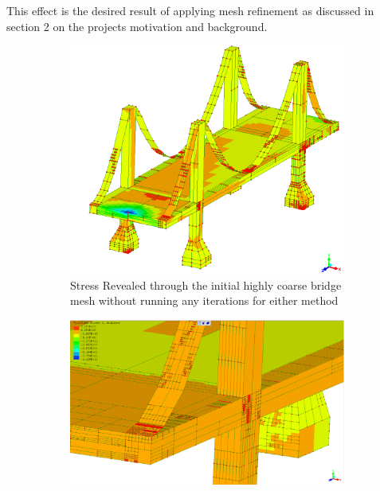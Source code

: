 \noindent
This effect is the desired result of applying mesh refinement as discussed in section 2 on the projects motivation and background.  


\begin{figure}[H]
\centering
\begin{subfigure}{.5\textwidth}
  \centering
  \includegraphics[width=0.9\linewidth]{../Graphics/BridgeCrossLoadingStress/Hybrid-best-3-2.png}
  \caption{Stress Revealed through the initial highly coarse bridge mesh without running any iterations for either method}
  \label{fig:sub1}
\end{subfigure}%
\begin{subfigure}{.5\textwidth}
  \centering
  \includegraphics[width=0.9\linewidth]{../Graphics/BridgeCrossLoadingStress/BridgeCrossLoadingStress6-3-2.png}

\end{subfigure}
\end{figure}
